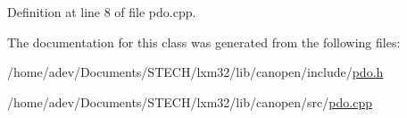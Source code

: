 Definition at line 8 of file pdo.\+cpp.



The documentation for this class was generated from the following files\+:\begin{DoxyCompactItemize}
\item 
/home/adev/\+Documents/\+S\+T\+E\+C\+H/lxm32/lib/canopen/include/\hyperlink{pdo_8h}{pdo.\+h}\item 
/home/adev/\+Documents/\+S\+T\+E\+C\+H/lxm32/lib/canopen/src/\hyperlink{pdo_8cpp}{pdo.\+cpp}\end{DoxyCompactItemize}
